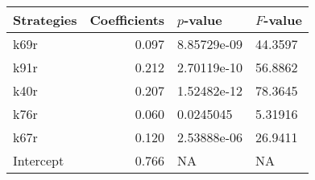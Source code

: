 \begin{tabular}{lrll}
\toprule
Strategies &  Coefficients &    $p$-value & $F$-value \\
\midrule
      k69r &         0.097 &  8.85729e-09 &   44.3597 \\
      k91r &         0.212 &  2.70119e-10 &   56.8862 \\
      k40r &         0.207 &  1.52482e-12 &   78.3645 \\
      k76r &         0.060 &    0.0245045 &   5.31916 \\
      k67r &         0.120 &  2.53888e-06 &   26.9411 \\
 Intercept &         0.766 &           NA &        NA \\
\bottomrule
\end{tabular}
